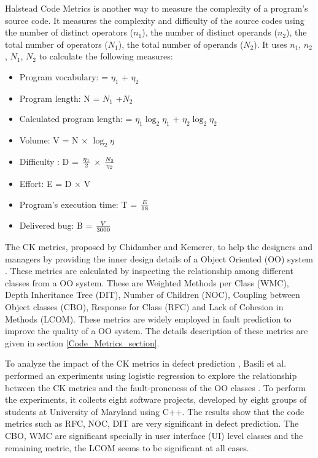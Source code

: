 \documentclass[12pt]{report}
\begin{document}
Halstead Code Metrics \cite{halstead1977elements} is another way to measure the complexity of a program's source code. It measures the complexity and difficulty of the source codes using the number of distinct operators ($n_{1}$), the number of distinct operands ($n_{2}$), the total number of operators ($N_{1}$), the total number of operands ($N_{2}$). It uses $n_{1}$, $n_{2}$, $N_{1}$, $N_{2}$ to calculate the following measures: 

\begin{itemize}
	\item Program vocabulary: \eta = $\eta_1$ + $\eta_2$ \,
	\item Program length: N = $N_1$ +$N_2$ \,
	\item Calculated program length:  = $\eta_1 \log_2 \eta_1$ + $\eta_2 \log_2 \eta_2$ \, 
	\item Volume: V = N $\times$ $\log_2 \eta$ \,
	\item Difficulty : D = { $\eta_1 \over 2 $ } $\times$ { $N_2 \over \eta_2$ } \,
	\item Effort: E =  D $\times$ V \,
	\item Program’s execution time: T = {$E \over 18$}\,
	\item Delivered bug: B = {$V \over 3000$} \,
\end{itemize}



The CK metrics, proposed by Chidamber and Kemerer, to help the designers and managers by providing the inner design details of a Object Oriented (OO) system \cite{chidamber1994metrics}. These metrics are calculated by inspecting the relationship among different classes from a OO system. These are Weighted Methods per Class (WMC), Depth Inheritance Tree (DIT), Number of Children (NOC), Coupling between Object classes (CBO), Response for Class (RFC) and Lack of Cohesion in Methods (LCOM). These metrics are widely employed in fault prediction to improve the quality of a OO system. The details description of these metrics are given in section \ref{Code_Metrics_section}. 

To analyze the impact of the CK metrics in defect prediction \cite{chidamber1994metrics}, Basili et al. performed an experiments using logistic regression to explore the relationship between the CK metrics and the fault-proneness of the OO classes \cite{basili1996validation}. To perform the experiments, it collects eight software projects, developed by eight groups of students at University of Maryland using C++. The results show that the code metrics such as RFC, NOC, DIT are very significant in defect prediction. The CBO, WMC are significant specially in user interface (UI) level classes and the remaining metric, the LCOM seems to be significant at all cases.
\end{document}
